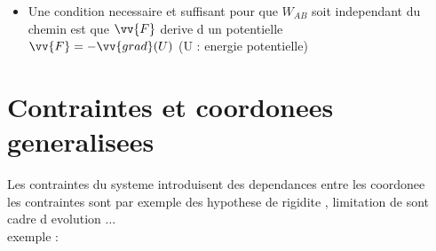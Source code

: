 \documentclass[12pt]{book}
\begin{document}
\begin{itemize}
\begin{itemize}
\begin{minipage}{0.39\linewidth}
                            \end{minipage}
                        \item Une condition necessaire et suffisant pour que $W_{AB}$ soit independant du chemin est que $\vv{F}$ derive d un potentielle \\
                            $\vv{F} = -\vv{grad}(U)$ (U : energie potentielle)              
                    \end{itemize}        
            \end{itemize}
            \pagebreak
        \section{Contraintes et coordonees generalisees}
            Les contraintes du systeme introduisent des dependances entre les coordonee \\ 
            les contraintes sont par exemple des hypothese de rigidite , limitation de sont cadre d evolution $\ldots$ \\
            exemple :
\end{document}
